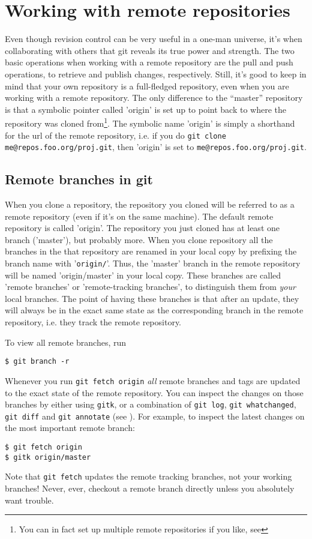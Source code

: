 \documentclass[a4paper,10pt]{article}
\begin{document}
\section{Working with remote repositories}
Even though revision control can be very useful in a one-man universe, it's
when collaborating with others that git reveals its true power and strength.
The two basic operations when working with a remote repository are the pull
and push operations, to retrieve and publish changes, respectively. Still, it's
good to keep in mind that your own repository is a full-fledged repository,
even when you are working with a remote repository. The only difference to
the ``master'' repository is that a symbolic pointer called 'origin' is set
up to point back to where the repository was cloned from\footnote{You can in
fact set up multiple remote repositories if you like, see }.
The symbolic name 'origin' is simply a shorthand for the url of the remote
repository, i.e. if you do \texttt{git clone me@repos.foo.org/proj.git}, then
'origin' is set to \texttt{me@repos.foo.org/proj.git}.


\subsection{Remote branches in git}
\label{sec:branch}
When you clone a repository, the repository you cloned will be referred to as
a remote repository (even if it's on the same machine). The default remote
repository is called 'origin'. The repository you just cloned has at least one
branch ('master'), but probably more.
When you clone repository all the branches in the that repository are renamed 
in your local copy by prefixing the branch name with '\texttt{origin/}'. Thus,
the 'master' branch in the remote repository will be named 'origin/master' in
your local copy.
These branches are called 'remote
branches' or 'remote-tracking branches', 
to distinguish them from \emph{your} local
branches. The point of having these branches is that after an update, 
they will always be in the exact same state as the corresponding branch in the 
remote repository, i.e. they track the remote repository.

To view all remote branches, run
\begin{verbatim}
$ git branch -r
\end{verbatim}
Whenever you run
\texttt{git fetch origin} \emph{all} remote branches and tags 
are updated to the exact
state of the remote repository. You can inspect the changes on those
branches by either using \texttt{gitk}, or a combination of \texttt{git log},
\texttt{git whatchanged}, \texttt{git diff} and \texttt{git annotate} (see
).
For example, to inspect the latest changes on the most important remote branch:
\begin{verbatim}
$ git fetch origin
$ gitk origin/master
\end{verbatim}
Note that \texttt{git fetch} updates the remote
tracking branches, not your working branches!  Never, ever, checkout a remote
branch directly unless you absolutely want trouble. 
\end{document}
